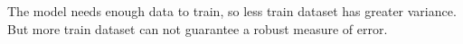 \documentclass{article}
\begin{document}
The model needs enough data to train, so less train dataset has greater variance. But more train dataset can not guarantee a robust measure of error.

\begin{figure}[!h]
\quad
{}
\quad
{}
\end{figure}
\end{document}
